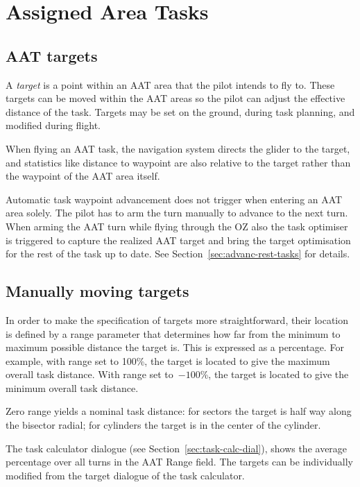 \section{Assigned Area Tasks}\label{sec:aat-tasks}

\subsection*{AAT targets}

A \emph{target} is a point within an AAT area that the pilot intends to
fly to.  These targets can be moved within the AAT areas so the pilot
can adjust the effective distance of the task.  Targets may be set on
the ground, during task planning, and modified during flight.

When flying an AAT task, the navigation system directs the glider to
the target, and statistics like distance to waypoint are also relative
to the target rather than the waypoint of the AAT area itself.

Automatic task waypoint advancement does not trigger when entering an
AAT area solely. The pilot has to arm the turn manually to advance to the next
turn. When arming the AAT turn while flying through the OZ also the task
optimiser is triggered to capture the realized AAT target and bring the target
optimisation for the rest of the task up to date. See Section~\ref{sec:advanc-rest-tasks} 
for details.

\subsection*{Manually moving targets}

In order to make the specification of targets more straightforward,
their location is defined by a range parameter that determines how
far from the minimum to maximum possible distance the target is.  This
is expressed as a percentage.  For example, with range set to 100\%,
the target is located to give the maximum overall task distance.  With
range set to~$-100$\%, the target is located to give the minimum overall
task distance.  

Zero range yields a nominal task distance: for sectors the target is
half way along the bisector radial; for cylinders the target is in the
center of the cylinder.

The task calculator dialogue (see Section~\ref{sec:task-calc-dial}), shows the
average percentage over all turns in the AAT Range field.
The targets can be individually modified from the target dialogue of the task
calculator.


